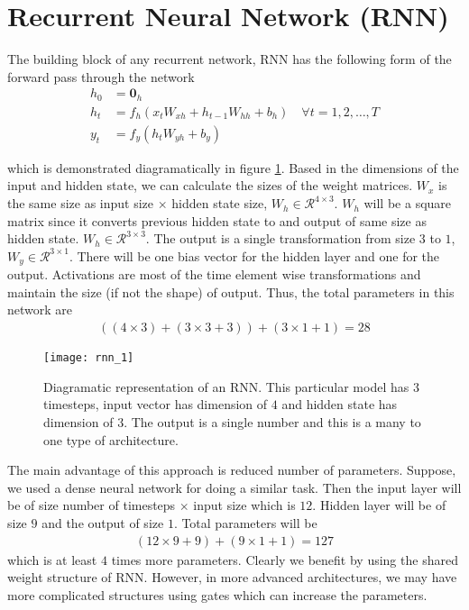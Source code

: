 \documentclass[../../deep_learning_notes.tex]{subfiles}
\begin{document}
\section{Recurrent Neural Network (RNN)}
The building block of any recurrent network, RNN has the following form of the forward pass through the network
\begin{align*}
    h_{0} &= \bm{0}_{h}\\
    h_{t} &= f_{h}(x_{t}W_{xh} + h_{t-1}W_{hh} + b_{h}) \quad \forall t = 1, 2, \ldots, T\\
    y_{t} &= f_{y}(h_{t}W_{yh} + b_{y})
\end{align*}

which is demonstrated diagramatically in figure \ref{fig:rnn_1}. Based in the dimensions of the input and hidden state, we can calculate the sizes of the weight matrices. $W_{x}$ is the same size as input size $\times$ hidden state size, $W_{h} \in \mathcal{R}^{4\times 3}$. $W_{h}$ will be a square matrix since it converts previous hidden state to and output of same size as hidden state. $W_{h} \in \mathcal{R}^{3 \times 3}$. The output is a single transformation from size $3$ to $1$, $W_{y} \in \mathcal{R}^{3 \times 1}$. There will be one bias vector for the hidden layer and one for the output. Activations are most of the time element wise transformations and maintain the size (if not the shape) of output. \newline
Thus, the total parameters in this network are
\begin{align*}
    ((4\times 3) + (3 \times 3 + 3)) + (3 \times 1 + 1) = 28
\end{align*}

\begin{figure}[h]
    \texttt{[image: rnn\_1]}
    \centering
    \caption {Diagramatic representation of an RNN. This particular model has $3$ timesteps, input vector has dimension of $4$ and hidden state has dimension of $3$. The output is a single number and this is a many to one type of architecture.}
    \label{fig:rnn_1} %
\end{figure}

The main advantage of this approach is reduced number of parameters. Suppose, we used a dense neural network for doing a similar task. Then the input layer will be of size number of timesteps $\times$ input size which is $12$. Hidden layer will be of size $9$ and the output of size $1$. Total parameters will be
\begin{align*}
    (12 \times 9 + 9) + (9 \times 1 + 1) = 127
\end{align*}
which is at least $4$ times more parameters. Clearly we benefit by using the shared weight structure of RNN. However, in more advanced architectures, we may have more complicated structures using gates which can increase the parameters.\newline
\end{document}
